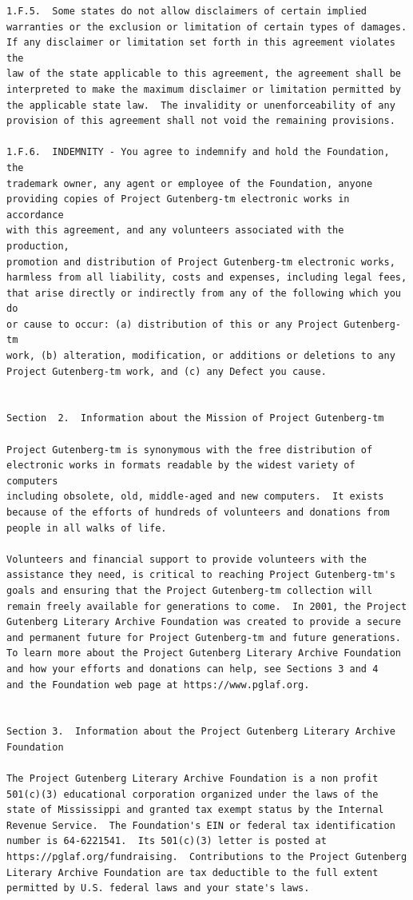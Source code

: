 \documentclass{book}
\begin{document}
\begin{verbatim}
1.F.5.  Some states do not allow disclaimers of certain implied
warranties or the exclusion or limitation of certain types of damages.
If any disclaimer or limitation set forth in this agreement violates the
law of the state applicable to this agreement, the agreement shall be
interpreted to make the maximum disclaimer or limitation permitted by
the applicable state law.  The invalidity or unenforceability of any
provision of this agreement shall not void the remaining provisions.

1.F.6.  INDEMNITY - You agree to indemnify and hold the Foundation, the
trademark owner, any agent or employee of the Foundation, anyone
providing copies of Project Gutenberg-tm electronic works in accordance
with this agreement, and any volunteers associated with the production,
promotion and distribution of Project Gutenberg-tm electronic works,
harmless from all liability, costs and expenses, including legal fees,
that arise directly or indirectly from any of the following which you do
or cause to occur: (a) distribution of this or any Project Gutenberg-tm
work, (b) alteration, modification, or additions or deletions to any
Project Gutenberg-tm work, and (c) any Defect you cause.


Section  2.  Information about the Mission of Project Gutenberg-tm

Project Gutenberg-tm is synonymous with the free distribution of
electronic works in formats readable by the widest variety of computers
including obsolete, old, middle-aged and new computers.  It exists
because of the efforts of hundreds of volunteers and donations from
people in all walks of life.

Volunteers and financial support to provide volunteers with the
assistance they need, is critical to reaching Project Gutenberg-tm's
goals and ensuring that the Project Gutenberg-tm collection will
remain freely available for generations to come.  In 2001, the Project
Gutenberg Literary Archive Foundation was created to provide a secure
and permanent future for Project Gutenberg-tm and future generations.
To learn more about the Project Gutenberg Literary Archive Foundation
and how your efforts and donations can help, see Sections 3 and 4
and the Foundation web page at https://www.pglaf.org.


Section 3.  Information about the Project Gutenberg Literary Archive
Foundation

The Project Gutenberg Literary Archive Foundation is a non profit
501(c)(3) educational corporation organized under the laws of the
state of Mississippi and granted tax exempt status by the Internal
Revenue Service.  The Foundation's EIN or federal tax identification
number is 64-6221541.  Its 501(c)(3) letter is posted at
https://pglaf.org/fundraising.  Contributions to the Project Gutenberg
Literary Archive Foundation are tax deductible to the full extent
permitted by U.S. federal laws and your state's laws.


\end{verbatim}
\end{document}
